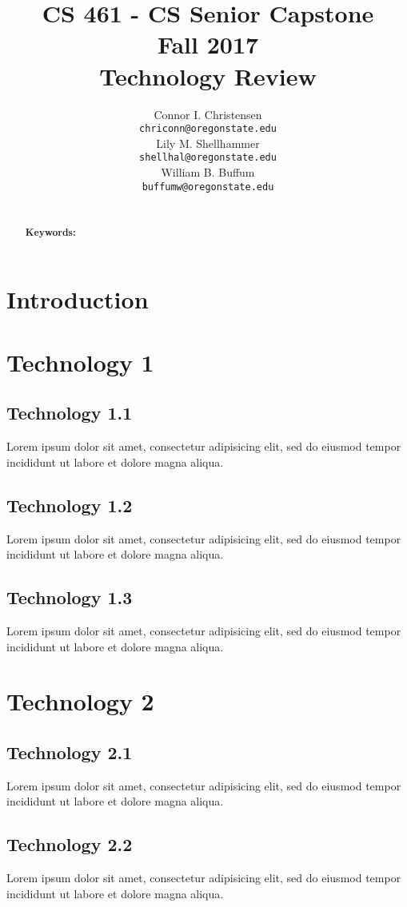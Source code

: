 \documentclass[draftclsnofoot,onecolumn,letterpaper,10pt,compsoc]{IEEEtran}
\title{CS 461 - CS Senior Capstone
	\\Fall 2017
	\\Technology Review
}
\author{
	Connor I. Christensen \\
	\texttt{chriconn@oregonstate.edu}
	\\
	Lily M. Shellhammer \\
	\texttt{shellhal@oregonstate.edu}
	\\
	William B. Buffum \\
	\texttt{buffumw@oregonstate.edu}
}
\begin{document}
\begin{titlingpage}
    \maketitle
    \begin{abstract}
			\\
			\textbf{Keywords:}
    \end{abstract}
		\pagebreak
		\tableofcontents
\end{titlingpage}

\section{Introduction}

\section{Technology 1}
	\subsection{Technology 1.1}
	Lorem ipsum dolor sit amet, consectetur adipisicing elit, sed do eiusmod tempor incididunt ut labore et dolore magna aliqua.\cite{Citation}
	\subsection{Technology 1.2}
	Lorem ipsum dolor sit amet, consectetur adipisicing elit, sed do eiusmod tempor incididunt ut labore et dolore magna aliqua.\cite{Citation}
	\subsection{Technology 1.3}
	Lorem ipsum dolor sit amet, consectetur adipisicing elit, sed do eiusmod tempor incididunt ut labore et dolore magna aliqua.\cite{Citation}

\section{Technology 2}
	\subsection{Technology 2.1}
	Lorem ipsum dolor sit amet, consectetur adipisicing elit, sed do eiusmod tempor incididunt ut labore et dolore magna aliqua.\cite{Citation}
	\subsection{Technology 2.2}
	Lorem ipsum dolor sit amet, consectetur adipisicing elit, sed do eiusmod tempor incididunt ut labore et dolore magna aliqua.\cite{Citation}
\end{document}
